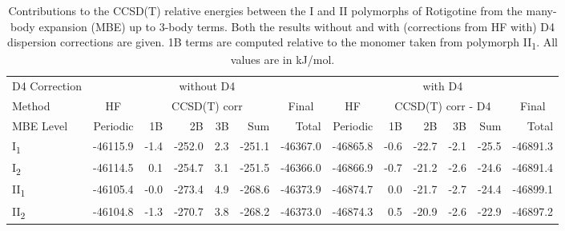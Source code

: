 \begin{table}[h]

\caption{\label{tab:rotigotine_mbe_contributions}Contributions to the CCSD(T) relative energies between the I and II polymorphs of Rotigotine from the many-body expansion (MBE) up to 3-body terms. Both the results without and with (corrections from HF with) D4 dispersion corrections are given. 1B terms are computed relative to the monomer taken from polymorph II\textsubscript{1}. All values are in kJ/mol.}
\begin{tabular}{lrrrrrrrrrrrr}
\toprule
D4 Correction & \multicolumn{6}{c}{without D4} & \multicolumn{6}{c}{with D4} \\ \cmidrule(lr){2-7} \cmidrule(lr){8-13} 
Method & \multicolumn{1}{c}{HF} & \multicolumn{4}{c}{CCSD(T) corr} & \multicolumn{1}{c}{Final} & \multicolumn{1}{c}{HF} & \multicolumn{4}{c}{CCSD(T) corr - D4} & \multicolumn{1}{c}{Final} \\ \cmidrule(lr){2-2} \cmidrule(lr){3-6} \cmidrule(lr){7-7} \cmidrule(lr){8-8} \cmidrule(lr){9-12} \cmidrule(lr){13-13}
MBE Level & Periodic & 1B & 2B & 3B & Sum & Total & Periodic & 1B & 2B & 3B & Sum & Total \\
\midrule
I\textsubscript{1} & -46115.9 & -1.4 & -252.0 & 2.3 & -251.1 & -46367.0 & -46865.8 & -0.6 & -22.7 & -2.1 & -25.5 & -46891.3 \\
I\textsubscript{2} & -46114.5 & 0.1 & -254.7 & 3.1 & -251.5 & -46366.0 & -46866.9 & -0.7 & -21.2 & -2.6 & -24.6 & -46891.4 \\
II\textsubscript{1} & -46105.4 & -0.0 & -273.4 & 4.9 & -268.6 & -46373.9 & -46874.7 & 0.0 & -21.7 & -2.7 & -24.4 & -46899.1 \\
II\textsubscript{2} & -46104.8 & -1.3 & -270.7 & 3.8 & -268.2 & -46373.0 & -46874.3 & 0.5 & -20.9 & -2.6 & -22.9 & -46897.2 \\
\bottomrule
\end{tabular}

\end{table}